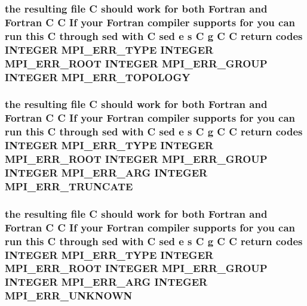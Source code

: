 \subsubsection{\setlength{\rightskip}{0pt plus 5cm}the resulting file C should {\bf work} for both Fortran and Fortran C C If your Fortran compiler supports for you can run this C through sed {\bf with} C sed e s C g C C return codes INTEGER MPI\_\-ERR\_\-TYPE INTEGER MPI\_\-ERR\_\-ROOT INTEGER MPI\_\-ERR\_\-GROUP INTEGER {\bf MPI\_\-ERR\_\-TOPOLOGY}}\label{mpif_8h_46c1d8500640a09b9ab190f05fff82d5}


\subsubsection{\setlength{\rightskip}{0pt plus 5cm}the resulting file C should {\bf work} for both Fortran and Fortran C C If your Fortran compiler supports for you can run this C through sed {\bf with} C sed e s C g C C return codes INTEGER MPI\_\-ERR\_\-TYPE INTEGER MPI\_\-ERR\_\-ROOT INTEGER MPI\_\-ERR\_\-GROUP INTEGER MPI\_\-ERR\_\-ARG INTEGER {\bf MPI\_\-ERR\_\-TRUNCATE}}\label{mpif_8h_fa621998a4f229dcdf972e5da257ee74}


\subsubsection{\setlength{\rightskip}{0pt plus 5cm}the resulting file C should {\bf work} for both Fortran and Fortran C C If your Fortran compiler supports for you can run this C through sed {\bf with} C sed e s C g C C return codes INTEGER MPI\_\-ERR\_\-TYPE INTEGER MPI\_\-ERR\_\-ROOT INTEGER MPI\_\-ERR\_\-GROUP INTEGER MPI\_\-ERR\_\-ARG INTEGER {\bf MPI\_\-ERR\_\-UNKNOWN}}\label{mpif_8h_108d80b9be33e2b4e87f504d8321ddfa}


